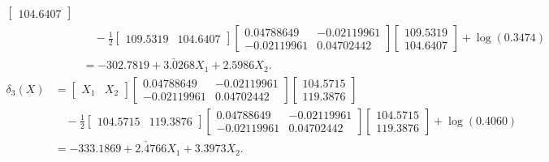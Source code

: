 \begin{enumerate}[label=\roman*.]
\begin{align*}
\begin{bmatrix}
            104.6407
            \end{bmatrix}
            \\[1em]
            &\quad
            -\frac{1}{2}
            \begin{bmatrix}
            109.5319 & 104.6407
            \end{bmatrix}
            \begin{bmatrix}
            0.04788649 & -0.02119961 \\
            -0.02119961 & 0.04702442
            \end{bmatrix}
            \begin{bmatrix}
            109.5319 \\
            104.6407
            \end{bmatrix}
            +\log(0.3474)
            \\[1em]
            &\underrightarrow{=-302.7819 + 3.0268X_1 + 2.5986X_2}.
          \end{align*}
          \begin{align*}
            \delta_3(X)
            &=
            \begin{bmatrix}
            X_1 & X_2
            \end{bmatrix}
            \begin{bmatrix}
            0.04788649 & -0.02119961 \\
            -0.02119961 & 0.04702442
            \end{bmatrix}
            \begin{bmatrix}
            104.5715 \\
            119.3876
            \end{bmatrix}
            \\[1em]
            &\quad
            -\frac{1}{2}
            \begin{bmatrix}
            104.5715 & 119.3876
            \end{bmatrix}
            \begin{bmatrix}
            0.04788649 & -0.02119961 \\
            -0.02119961 & 0.04702442
            \end{bmatrix}
            \begin{bmatrix}
            104.5715 \\
            119.3876
            \end{bmatrix}
            +\log(0.4060)
            \\[1em]
            & \underrightarrow{= -333.1869 + 2.4766X_1 + 3.3973X_2}.
          \end{align*}


\end{enumerate}
